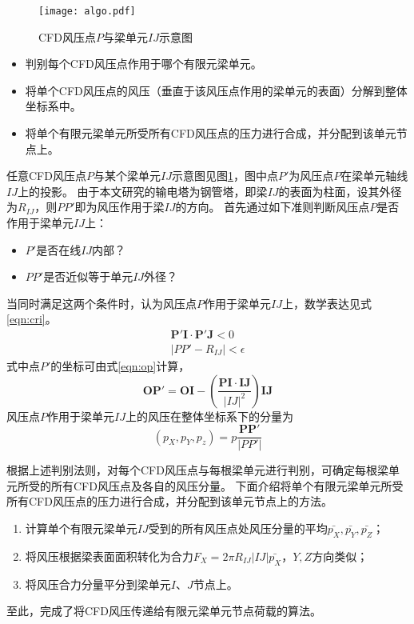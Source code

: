 \begin{figure}[!htbp]
	\centering
	\texttt{[image: algo.pdf]}
	\caption{CFD风压点$P$与梁单元$IJ$示意图}
	\label{fig:algo}
\end{figure}

\begin{itemize}
	\item 判别每个CFD风压点作用于哪个有限元梁单元。
	\item 将单个CFD风压点的风压（垂直于该风压点作用的梁单元的表面）分解到整体坐标系中。
	\item 将单个有限元梁单元所受所有CFD风压点的压力进行合成，并分配到该单元节点上。
\end{itemize}

任意CFD风压点$P$与某个梁单元$IJ$示意图见图\ref{fig:algo}，图中点$P'$为风压点$P$在梁单元轴线$IJ$上的投影。
由于本文研究的输电塔为钢管塔，即梁$IJ$的表面为柱面，设其外径为$R_{IJ}$，则$PP'$即为风压作用于梁$IJ$的方向。
首先通过如下准则判断风压点$P$是否作用于梁单元$IJ$上：
\begin{itemize}
	\item $P'$是否在线$IJ$内部？
	\item $PP'$是否近似等于单元$IJ$外径？
\end{itemize}
当同时满足这两个条件时，认为风压点$P$作用于梁单元$IJ$上，数学表达见式\eqref{eqn:cri}。
\begin{gather}\label{eqn:cri}
	\bm{P'I}\cdot\bm{P'J} < 0  \nonumber \\
	|PP'-R_{IJ}| < \epsilon
\end{gather}
式中点$P'$的坐标可由式\eqref{eqn:op}计算，
\begin{equation}\label{eqn:op}
	\bm{OP'}=\bm{OI} - \left( \frac{\bm{PI}\cdot\bm{IJ}}{|IJ|^2} \right)\bm{IJ}
\end{equation}
风压点$P$作用于梁单元$IJ$上的风压在整体坐标系下的分量为
\begin{equation}
	(p_X, p_Y, p_z) = p\frac{\bm{PP'}}{|PP'|}
\end{equation}

根据上述判别法则，对每个CFD风压点与每根梁单元进行判别，可确定每根梁单元所受的所有CFD风压点及各自的风压分量。
下面介绍将单个有限元梁单元所受所有CFD风压点的压力进行合成，并分配到该单元节点上的方法。
\begin{enumerate}
	\item 计算单个有限元梁单元$IJ$受到的所有风压点处风压分量的平均$\bar{p_X},\bar{p_Y},\bar{p_Z}$；
	\item 将风压根据梁表面面积转化为合力$F_X=2\pi R_{IJ} |IJ| \bar{p_X}$，$Y,Z$方向类似；
	\item 将风压合力分量平分到梁单元$I$、$J$节点上。
\end{enumerate}
至此，完成了将CFD风压传递给有限元梁单元节点荷载的算法。

